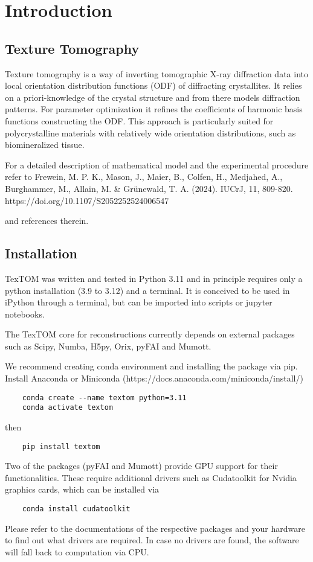 \section{Introduction}

\subsection{Texture Tomography}
Texture tomography is a way of inverting tomographic X-ray diffraction data into local
orientation distribution functions (ODF) of diffracting crystallites.
It relies on a priori-knowledge of the crystal structure and from there
models diffraction patterns. For parameter optimization it refines
the coefficients of harmonic basis functions constructing the ODF.
This approach is particularly suited for polycrystalline materials
with relatively wide orientation distributions, such as biomineralized tissue.

For a detailed description of mathematical model and the experimental procedure
refer to 
Frewein, M. P. K., Mason, J., Maier, B., Colfen, H., Medjahed, A., Burghammer, 
M., Allain, M. \& Grünewald, T. A. (2024). IUCrJ, 11, 809-820. https://doi.org/10.1107/S2052252524006547

and references therein.

\subsection{Installation}

TexTOM was written and tested in Python 3.11 and in principle requires only a python installation (3.9 to 3.12) and a terminal.
It is conceived to be used in iPython through a terminal, but can be imported into scripts or jupyter notebooks.

The TexTOM core for reconstructions currently depends on external packages such as Scipy, Numba, H5py, Orix, pyFAI and Mumott.

We recommend creating conda environment and installing the package via pip.
Install Anaconda or Miniconda (https://docs.anaconda.com/miniconda/install/) 
\begin{verbatim}
    conda create --name textom python=3.11
    conda activate textom
\end{verbatim}
then
\begin{verbatim}
    pip install textom
\end{verbatim}

Two of the packages (pyFAI and Mumott) provide GPU support for their functionalities.
These require additional drivers such as Cudatoolkit for Nvidia graphics cards, which
can be installed via 
\begin{verbatim}
    conda install cudatoolkit
\end{verbatim}
Please refer to the documentations of the respective packages and your hardware
to find out what drivers are required.
In case no drivers are found, the software will fall back to computation via CPU.

